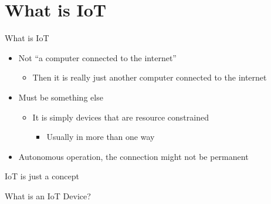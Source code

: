 \hypertarget{what-is-iot}{%
\section{What is IoT}\label{what-is-iot}}

\begin{frame}{What is IoT}
\protect\hypertarget{what-is-iot-1}{}

\begin{itemize}
\tightlist
\item
  Not “a computer connected to the internet”

  \begin{itemize}
  \tightlist
  \item
    Then it is really just another computer connected to the internet
  \end{itemize}
\item
  Must be something else

  \begin{itemize}
  \tightlist
  \item
    It is simply devices that are resource constrained

    \begin{itemize}
    \tightlist
    \item
      Usually in more than one way
    \end{itemize}
  \end{itemize}
\item
  Autonomous operation, the connection might not be permanent
\end{itemize}

\end{frame}

\begin{frame}{IoT is just a concept}
\protect\hypertarget{iot-is-just-a-concept}{}


\end{frame}

\begin{frame}{What is an IoT Device?}
\protect\hypertarget{what-is-an-iot-device}{}


\end{frame}

